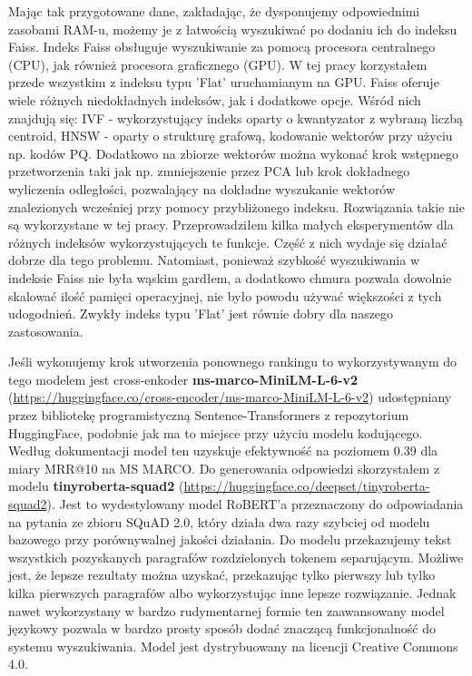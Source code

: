 Mając tak przygotowane dane, zakładając, że dysponujemy odpowiednimi zasobami RAM-u, możemy je z łatwością wyszukiwać po dodaniu ich do indeksu Faiss. Indeks Faiss obsługuje wyszukiwanie za pomocą procesora centralnego (CPU), jak również procesora graficznego (GPU). W tej pracy korzystałem przede wszystkim z indeksu typu 'Flat' uruchamianym na GPU. Faiss oferuje wiele różnych niedokładnych indeksów, jak i dodatkowe opcje. Wśród nich znajdują się: IVF - wykorzystujący indeks oparty o kwantyzator z wybraną liczbą centroid, HNSW - oparty o strukturę grafową, kodowanie wektorów przy użyciu np. kodów PQ. Dodatkowo na zbiorze wektorów można wykonać krok wstępnego przetworzenia taki jak np. zmniejszenie przez PCA lub krok dokładnego wyliczenia odległości, pozwalający na dokładne wyszukanie wektorów znalezionych wcześniej przy pomocy przybliżonego indeksu. Rozwiązania takie nie są wykorzystane w tej pracy. Przeprowadziłem kilka małych eksperymentów dla różnych indeksów wykorzystujących te funkcje. Część z nich wydaje się działać dobrze dla tego problemu. Natomiast, ponieważ szybkość wyszukiwania w indeksie Faiss nie była wąskim gardłem, a dodatkowo chmura pozwala dowolnie skalować ilość pamięci operacyjnej, nie było powodu używać większości z tych udogodnień. Zwykły indeks typu 'Flat' jest równie dobry dla naszego zastosowania.\newline

Jeśli wykonujemy krok utworzenia ponownego rankingu to wykorzystywanym do tego modelem jest cross-enkoder \textbf{
ms-marco-MiniLM-L-6-v2} (\url{https://huggingface.co/cross-encoder/ms-marco-MiniLM-L-6-v2}) udostępniany przez bibliotekę programistyczną Sentence-Transformers z repozytorium HuggingFace, podobnie jak ma to miejsce przy użyciu modelu kodującego. Według dokumentacji model ten uzyskuje efektywność na poziomem 0.39 dla miary MRR@10 na MS MARCO. Do generowania odpowiedzi skorzystałem z modelu \textbf{tinyroberta-squad2} (\url{https://huggingface.co/deepset/tinyroberta-squad2}). Jest to wydestylowany model RoBERT'a przeznaczony do odpowiadania na pytania ze zbioru SQuAD 2.0, który działa dwa razy szybciej od modelu bazowego przy porównywalnej jakości działania. Do modelu przekazujemy tekst wszystkich pozyskanych paragrafów rozdzielonych tokenem separującym. Możliwe jest, że lepsze rezultaty można uzyskać, przekazując tylko pierwszy lub tylko kilka pierwszych paragrafów albo wykorzystując inne lepsze rozwiązanie. Jednak nawet wykorzystany w bardzo rudymentarnej formie ten zaawansowany model językowy pozwala w bardzo prosty sposób dodać znaczącą funkcjonalność do systemu wyszukiwania. Model jest dystrybuowany na licencji Creative Commons 4.0.\newline

